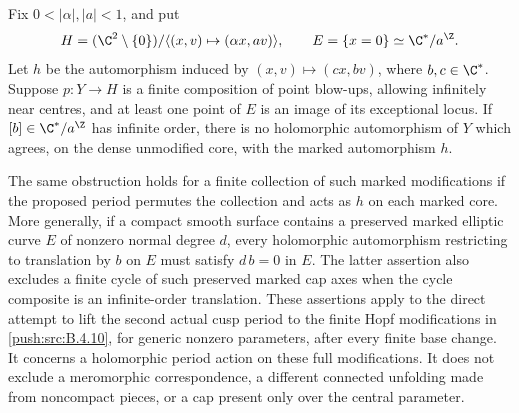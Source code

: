 \begin{proposition}\label{push:src:B.4.13}
Fix $0<|\alpha|,|a|<1$, and put
\[
 H=(\C^2\setminus\{0\})/
       \langle(x,v)\mapsto(\alpha x,av)\rangle,
       \qquad E=\{x=0\}\simeq\C^*/a^\Z.
\]
Let $h$ be the automorphism induced by
$(x,v)\mapsto(c x,bv)$, where $b,c\in\C^*$.
Suppose $p:Y\to H$ is a finite composition of point blow-ups,
allowing infinitely near centres, and at least one point of $E$
is an image of its exceptional locus. If $[b]\in\C^*/a^\Z$ has
infinite order, there is no holomorphic automorphism of $Y$
which agrees, on the dense unmodified core, with the marked
automorphism $h$.

The same obstruction holds for a finite collection of such marked
modifications if the proposed period permutes the collection and
acts as $h$ on each marked core.
More generally, if a compact smooth surface contains a preserved
marked elliptic curve $E$ of nonzero normal degree $d$, every
holomorphic automorphism restricting to translation by $b$ on $E$
must satisfy $d\,b=0$ in $E$.
The latter assertion also excludes a finite cycle of such preserved
marked cap axes when the cycle composite is an infinite-order
translation. These assertions apply to the direct attempt
to lift the second actual cusp period to the finite Hopf
modifications in \ref{push:src:B.4.10}, for generic nonzero parameters, after every
finite base change. It concerns a holomorphic period action on
these full modifications. It does not exclude a meromorphic
correspondence, a different connected unfolding made from
noncompact pieces, or a cap present only over the central parameter.
\end{proposition}

